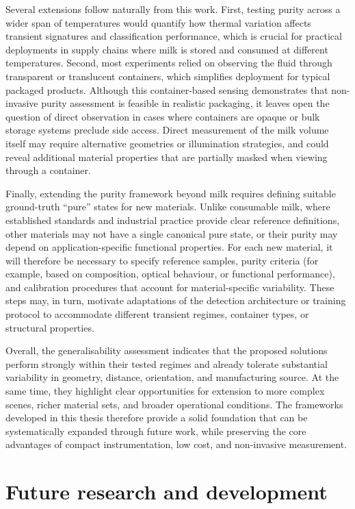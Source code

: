\documentclass[12pt,a4paper,oneside]{report}
\let\oldsection\section
\renewcommand{\section}{\clearpage\oldsection}
\begin{document}
Several extensions follow naturally from this work. First, testing purity across a wider span of temperatures would quantify how thermal variation affects transient signatures and classification performance, which is crucial for practical deployments in supply chains where milk is stored and consumed at different temperatures. Second, most experiments relied on observing the fluid through transparent or translucent containers, which simplifies deployment for typical packaged products. Although this container-based sensing demonstrates that non-invasive purity assessment is feasible in realistic packaging, it leaves open the question of direct observation in cases where containers are opaque or bulk storage systems preclude side access. Direct measurement of the milk volume itself may require alternative geometries or illumination strategies, and could reveal additional material properties that are partially masked when viewing through a container.

Finally, extending the purity framework beyond milk requires defining suitable ground-truth ``pure'' states for new materials. Unlike consumable milk, where established standards and industrial practice provide clear reference definitions, other materials may not have a single canonical pure state, or their purity may depend on application-specific functional properties. For each new material, it will therefore be necessary to specify reference samples, purity criteria (for example, based on composition, optical behaviour, or functional performance), and calibration procedures that account for material-specific variability. These steps may, in turn, motivate adaptations of the detection architecture or training protocol to accommodate different transient regimes, container types, or structural properties.

Overall, the generalisability assessment indicates that the proposed solutions perform strongly within their tested regimes and already tolerate substantial variability in geometry, distance, orientation, and manufacturing source. At the same time, they highlight clear opportunities for extension to more complex scenes, richer material sets, and broader operational conditions. The frameworks developed in this thesis therefore provide a solid foundation that can be systematically expanded through future work, while preserving the core advantages of compact instrumentation, low cost, and non-invasive measurement.

\section{Future research and development}
\label{sec:future_research_development_chapter7}
\end{document}
